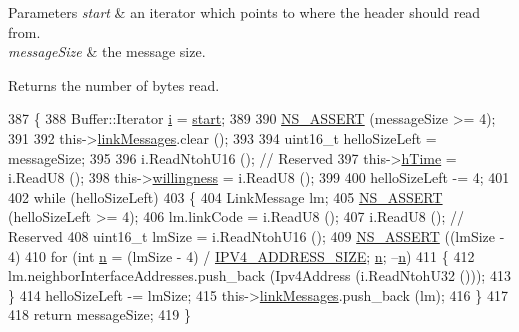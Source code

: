 \begin{DoxyParams}{Parameters}
{\em start} & an iterator which points to where the header should read from. \\
\hline
{\em message\+Size} & the message size. \\
\hline
\end{DoxyParams}
\begin{DoxyReturn}{Returns}
the number of bytes read. 
\end{DoxyReturn}

\begin{DoxyCode}
387 \{
388   Buffer::Iterator \hyperlink{bernuolliDistribution_8m_a6f6ccfcf58b31cb6412107d9d5281426}{i} = \hyperlink{namespacevisualizer_1_1core_a2a35e5d8a34af358b508dac8635754e0}{start};
389 
390   \hyperlink{assert_8h_a6dccdb0de9b252f60088ce281c49d052}{NS\_ASSERT} (messageSize >= 4);
391 
392   this->\hyperlink{structns3_1_1olsr_1_1MessageHeader_1_1Hello_aa6eb8d2a413314c764f5eaf669655f59}{linkMessages}.clear ();
393 
394   uint16\_t helloSizeLeft = messageSize;
395 
396   i.ReadNtohU16 (); \textcolor{comment}{// Reserved}
397   this->\hyperlink{structns3_1_1olsr_1_1MessageHeader_1_1Hello_ab3ca4a7d3f354ac3c022cf9e7f799ae2}{hTime} = i.ReadU8 ();
398   this->\hyperlink{structns3_1_1olsr_1_1MessageHeader_1_1Hello_a6458c9b671b767990245f81d1c64c56f}{willingness} = i.ReadU8 ();
399 
400   helloSizeLeft -= 4;
401 
402   \textcolor{keywordflow}{while} (helloSizeLeft)
403     \{
404       LinkMessage lm;
405       \hyperlink{assert_8h_a6dccdb0de9b252f60088ce281c49d052}{NS\_ASSERT} (helloSizeLeft >= 4);
406       lm.linkCode = i.ReadU8 ();
407       i.ReadU8 (); \textcolor{comment}{// Reserved}
408       uint16\_t lmSize = i.ReadNtohU16 ();
409       \hyperlink{assert_8h_a6dccdb0de9b252f60088ce281c49d052}{NS\_ASSERT} ((lmSize - 4) %
410       \textcolor{keywordflow}{for} (\textcolor{keywordtype}{int} \hyperlink{namespacesample-rng-plot_aeb5ee5c431e338ef39b7ac5431242e1d}{n} = (lmSize - 4) / \hyperlink{olsr-header_8cc_a78eabd4fb6c036f7de9b598066b3c39e}{IPV4\_ADDRESS\_SIZE}; \hyperlink{namespacesample-rng-plot_aeb5ee5c431e338ef39b7ac5431242e1d}{n}; --\hyperlink{namespacesample-rng-plot_aeb5ee5c431e338ef39b7ac5431242e1d}{n})
411         \{
412           lm.neighborInterfaceAddresses.push\_back (Ipv4Address (i.ReadNtohU32 ()));
413         \}
414       helloSizeLeft -= lmSize;
415       this->\hyperlink{structns3_1_1olsr_1_1MessageHeader_1_1Hello_aa6eb8d2a413314c764f5eaf669655f59}{linkMessages}.push\_back (lm);
416     \}
417 
418   \textcolor{keywordflow}{return} messageSize;
419 \}
\end{DoxyCode}


